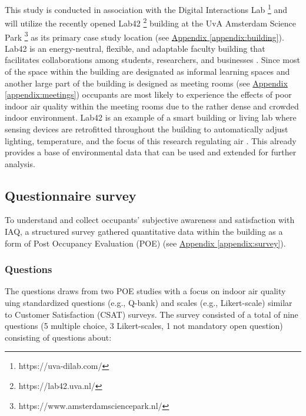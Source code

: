 This study is conducted in association with the Digital Interactions Lab \footnote{https://uva-dilab.com/} and will utilize the recently opened Lab42 \footnote{https://lab42.uva.nl/} building at the UvA Amsterdam Science Park \footnote{https://www.amsterdamsciencepark.nl/} as its primary case study location (see \hyperref[appendix:building]{Appendix \ref*{appendix:building}}). Lab42 is an energy-neutral, flexible, and adaptable faculty building that facilitates collaborations among students, researchers, and businesses \cite{benthem_2022}. Since most of the space within the building are designated as informal learning spaces and another large part of the building is designed as meeting rooms (see \hyperref[appendix:meetings]{Appendix \ref*{appendix:meetings}}) occupants are most likely to experience the effects of poor indoor air quality within the meeting rooms due to the rather dense and crowded indoor environment. Lab42 is an example of a smart building or living lab where sensing devices are retrofitted throughout the building to automatically adjust lighting, temperature, and the focus of this research regulating air \cite{architects_lab42_2022}. This already provides a base of environmental data that can be used and extended for further analysis. 


\subsection{Questionnaire survey}
\label{sec:questionnaire}

To understand and collect occupants' subjective awareness and satisfaction with IAQ, a structured survey gathered quantitative data within the building as a form of Post Occupancy Evaluation (POE) (see \hyperref[appendix:survey]{Appendix \ref*{appendix:survey}}).


\subsubsection{Questions}
The questions draws from two POE studies with a focus on indoor air quality \cite{silva_post-occupancy_2017, son_perceived_2023} uing standardized questions (e.g., Q-bank) and scales (e.g., Likert-scale) similar to Customer Satisfaction (CSAT) surveys. The survey consisted of a total of nine questions (5 multiple choice, 3 Likert-scales, 1 not mandatory open question) consisting of questions about:

